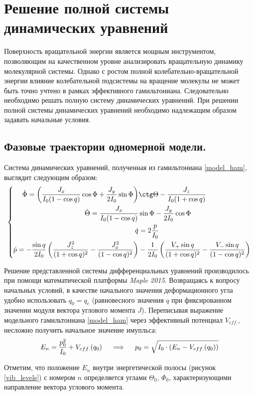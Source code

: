 \section{Решение полной системы динамических уравнений}
Поверхность вращательной энергии является мощным инструментом, позволяющим на качественном уровне анализировать вращательную динамику молекулярной системы. Однако с ростом полной колебательно-вращательной энергии влияние колебательной подсистемы на вращение молекулы не может быть точно учтено в рамках эффективного гамильтониана. Следовательно необходимо решать полную систему динамических уравнений. При решении полной системы динамических уравнений необходимо надлежащим образом задавать начальные условия.

\subsection{Фазовые траектории одномерной модели.}

Система динамических уравнений, полученная из гамильтониана \eqref{model_ham}, выглядит следующим образом:
\vverh
\begin{gather}
\left\{
\begin{aligned}
\dot{\Phi} = \left( \frac{J_x}{I_0 ( 1 - \cos q)} \cos \Phi + \frac{J_y}{2I_0} \sin \Phi \right) &\ctg \Theta - \frac{J_z}{I_0 (1 + \cos q)} \\
\dot{\Theta} = \frac{J_x}{I_0 (1 - \cos q)} &\sin \Phi - \frac{J_y}{2I_0} \cos \Phi \\
\dot{q} &= 2	\frac{p}{I_0} \\
\dot{p} = - \frac{\sin q}{2I_0} \left( \frac{J_z^2}{(1 + \cos q)^2} - \frac{J_x^2}{(1 - \cos q)^2} \right) &- \frac{1}{2I_0} \left( \frac{V_{+} \sin q}{(1 + \cos q)^2} - \frac{V_{-} \sin q}{(1 - \cos q)^2} \right)
\end{aligned}
\right. \notag
\end{gather}

Решение представленной системы дифференциальных уравнений производилось при помощи математической платформы \textit{Maple 2015}. Возвращаясь к вопросу начальных условий, в качестве начального значения деформационного угла удобно использовать $q_0 = q_e$ (равновесного значения $q$ при фиксированном значении модуля вектора углового момента $J$). Переписывая выражение модельного гамильтониана \eqref{model_ham} через эффективный потенциал $V_{eff.}$, несложно получить начальное значение имупльса:
\vverh
\begin{gather}
E_n = \frac{p_0^2}{I_0} + V_{eff.} (q_0) \quad \implies \quad p_0 = \sqrt{I_0 \cdot \left( E_n - V_{eff.} (q_0) \right) } \notag
\end{gather}

Отметим, что положение $E_n$ внутри энергетической полосы (рисунок \eqref{vib_levels}) с номером $n$ определяется углами $\Theta_0$, $\Phi_0$, характеризующими направление вектора углового момента. 